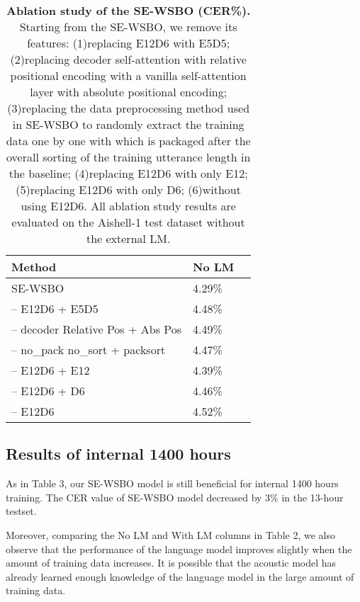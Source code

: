 \documentclass[a4paper]{article}
\begin{document}
\begin{table}[t]
  \caption{\noindent\textbf{Ablation study of the SE-WSBO (CER\%).} Starting from the SE-WSBO, we remove its features: (1)replacing E12D6 with E5D5; (2)replacing decoder self-attention with relative positional encoding with a vanilla self-attention layer \cite{Vaswani2017AttentionIA} with absolute positional encoding; (3)replacing the data preprocessing method used in SE-WSBO to randomly extract the training data one by one with which is packaged after the overall sorting of the training utterance length in the baseline; (4)replacing E12D6 with only E12; (5)replacing E12D6 with only D6; (6)without using E12D6. All ablation study results are evaluated on the Aishell-1 test dataset without the external LM.}
  \label{tab:word_styles2}
  \centering
  \begin{tabular}{lll}
    \toprule
    \textbf{Method} & \textbf{No LM} \\
    \midrule

    SE-WSBO     & 4.29\%                  \\
    \quad -- E12D6 + E5D5     & 4.48\%                  \\
    \quad\quad-- decoder Relative Pos + Abs Pos     & 4.49\% \\
    \quad\quad\quad-- no\_pack no\_sort + packsort    & 4.47\% \\
    \quad -- E12D6 + E12     & 4.39\%                  \\
    \quad -- E12D6 + D6     & 4.46\%                  \\
    \quad-- E12D6    & 4.52\% \\
    \bottomrule
  \end{tabular}
\end{table}


\subsection{Results of internal 1400 hours}
As in Table 3, our SE-WSBO model is still beneficial for internal 1400 hours training. The CER value of SE-WSBO model decreased by 3\% in the 13-hour testset.

Moreover, comparing the No LM and With LM columns in Table 2, we also observe that the performance of the language model improves slightly when the amount of training data increases. 
It is possible that the acoustic model has already learned enough knowledge of the language model in the large amount of training data.
\end{document}
